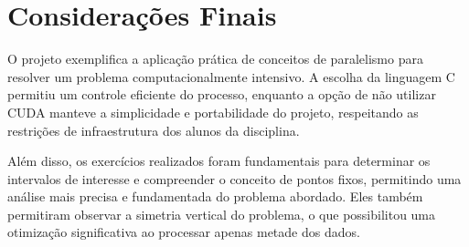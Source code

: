\section{Considerações Finais}

O projeto exemplifica a aplicação prática de conceitos de paralelismo para resolver um problema computacionalmente intensivo. A escolha da linguagem C permitiu um controle eficiente do processo, enquanto a opção de não utilizar CUDA manteve a simplicidade e portabilidade do projeto, respeitando as restrições de infraestrutura dos alunos da disciplina.

Além disso, os exercícios realizados foram fundamentais para determinar os intervalos de interesse e compreender o conceito de pontos fixos, permitindo uma análise mais precisa e fundamentada do problema abordado. Eles também permitiram observar a simetria vertical do problema, o que possibilitou uma otimização significativa ao processar apenas metade dos dados.
